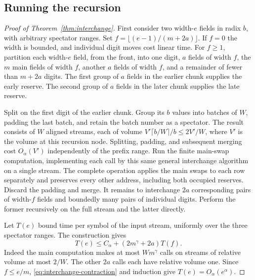 \subsection{Running the recursion}
\begin{proof}[Proof of Theorem~\ref{thm:interchange}]
First consider two width-$e$ fields in radix $b$, with arbitrary
spectator ranges. Set $f=\lfloor(e-1)/(m+2a)\rfloor$. If $f=0$ the
width is bounded, and individual digit moves cost linear time. For
$f\ge1$, partition each width-$e$ field, from the front, into one
digit, $a$ fields of width $f$, the $m$ main fields of width $f$,
another $a$ fields of width $f$, and a remainder of fewer than $m+2a$
digits. The first group of $a$ fields in the earlier chunk supplies
the early reserve. The second group of $a$ fields in the later chunk
supplies the late reserve.

Split on the first digit of the earlier chunk. Group its $b$ values
into batches of $W$, padding the last batch, and retain the batch
number as a spectator. The result consists of $W$ aligned streams,
each of volume $V'\lceil b/W\rceil/b\le2V'/W$, where $V'$ is the
volume at this recursion node. Splitting, padding, and subsequent
merging cost $O_\alpha(V')$ independently of the prefix range.
Run the finite main-swap computation, implementing each call by this
same general interchange algorithm on a single stream. The complete
operation applies the main swaps to each row separately and preserves
every other address, including both occupied reserves. Discard the
padding and merge. It remains to interchange $2a$ corresponding
pairs of width-$f$ fields and boundedly many pairs of individual
digits. Perform the former recursively on the full stream and the
latter directly.

Let $T(e)$ bound time per symbol of the input stream, uniformly over
the three spectator ranges. The construction gives
\[
            T(e)\le C_\alpha+(2m^\gamma+2a)T(f).
\]
Indeed the main computation makes at most $Wm^\gamma$ calls on
streams of relative volume at most $2/W$. The other $2a$ calls
each have relative volume one. Since $f\le e/m$,
\eqref{eq:interchange-contraction} and induction give
$T(e)=O_\alpha(e^\alpha)$.


\end{proof}
